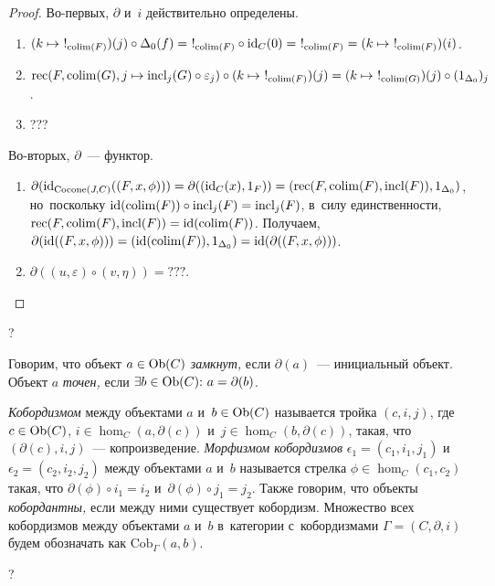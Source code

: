 \documentclass{article}
\begin{document}
\begin{proof}
    Во-первых, $\partial$ и~$i$ действительно определены.
    \begin{enumerate}
        \item $(k \mapsto\ !_{\mathrm{colim}(F)})(j) \circ \Delta_0(f) =\ !_{\mathrm{colim}(F)} \circ \mathrm{id}_C(0) =\ !_{\mathrm{colim}(F)} = (k \mapsto\ !_{\mathrm{colim}(F)})(i)$.
        \item $\mathrm{rec}(F, \mathrm{colim}(G), j \mapsto \mathrm{incl}_j(G) \circ \varepsilon_j) \circ (k \mapsto\ !_{\mathrm{colim}(F)})(j) = (k \mapsto\ !_{\mathrm{colim}(G)})(j) \circ (1_{\Delta_0})_j$.
        \item ???
    \end{enumerate}

    Во-вторых, $\partial$~— функтор.
    \begin{enumerate}
        \item $\partial(\mathrm{id}_{\mathrm{Cocone}(J, C)}((F, x, \phi))) = \partial((\mathrm{id}_C(x), 1_F)) = (\mathrm{rec}(F, \mathrm{colim}(F), \mathrm{incl}(F)), 1_{\Delta_0})$,
        но~поскольку $\mathrm{id}(\mathrm{colim}(F)) \circ \mathrm{incl}_j(F) = \mathrm{incl}_j(F)$, в~силу единственности,
        $\mathrm{rec}(F, \mathrm{colim}(F), \mathrm{incl}(F)) = \mathrm{id}(\mathrm{colim}(F))$. Получаем,
        $\partial(\mathrm{id}((F, x, \phi))) = (\mathrm{id}(\mathrm{colim}(F)), 1_{\Delta_0}) = \mathrm{id}(\partial((F, x, \phi)))$.

        \item $\partial((u, \varepsilon) \circ (v, \eta)) = ??? $.
    \end{enumerate}
\end{proof}

?

Говорим, что объект $a \in \mathrm{Ob}(C)$ \textit{замкнут,} если $\partial(a)$~— инициальный объект.
Объект $a$ \textit{точен,} если $\exists b \in \Ob(C){:}\ a = \partial(b)$.

\textit{Кобордизмом} между объектами $a$ и~$b \in \mathrm{Ob}(C)$ называется тройка $(c, i, j)$,
где $c \in \mathrm{Ob}(C)$, $i \in \hom_C(a, \partial(c))$ и~$j \in \hom_C(b, \partial(c))$,
такая, что $(\partial(c), i, j)$~— копроизведение. \textit{Морфизмом кобордизмов} $\epsilon_1 = (c_1, i_1, j_1)$
и~$\epsilon_2 = (c_2, i_2, j_2)$ между объектами $a$ и~$b$ называется стрелка $\phi \in \hom_C(c_1, c_2)$
такая, что $\partial(\phi) \circ i_1 = i_2$ и~$\partial(\phi) \circ j_1 = j_2$. Также говорим, что объекты \textit{кобордантны,}
если между ними существует кобордизм. Множество всех кобордизмов между объектами $a$ и~$b$ в~категории с~кобордизмами
$\Gamma = (C, \partial, i)$ будем обозначать как $\mathrm{Cob}_\Gamma(a, b)$.

?
\end{document}
